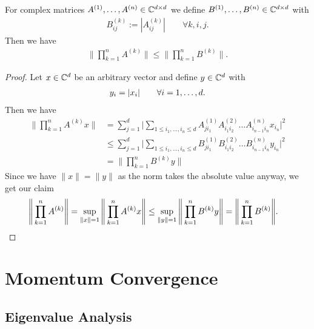 \begin{lemma}
	\label{lem-appdx: absolute value inside operator norms}
	For complex matrices \(A^{(1)},\dots,A^{(n)}\in\mathbb{C}^{d\times d}\)
	we define \(B^{(1)},\dots,B^{(n)}\in\mathbb{C}^{d\times d}\)
	with
	\begin{align*}
		B^{(k)}_{ij} := |A^{(k)}_{ij}| \qquad \forall k,i,j.
	\end{align*}
	Then we have
	\begin{align*}
		\Bigg\|\prod_{k=1}^n A^{(k)}\Bigg\| \le \Bigg\|\prod_{k=1}^n B^{(k)}\Bigg\|.
	\end{align*}
\end{lemma}
\begin{proof}
	Let \(x\in\mathbb{C}^d\) be an arbitrary vector and define \(y\in\mathbb{C}^d\)
	with
	\begin{align*}
		y_i = |x_i| \qquad \forall i=1,\dots,d.
	\end{align*}
	Then we have
	\begin{align*}
		\Bigg\| \prod_{k=1}^n A^{(k)} x \Bigg\|
		&= \sum_{j=1}^{d} \Big| \sum_{1\le i_1,\dots, i_n \le d}
		A^{(1)}_{j i_1} A^{(2)}_{i_1 i_2} \dots A^{(n)}_{i_{n-1} i_n} x_{i_n} \Big|^2
		\\
		&\le \sum_{j=1}^{d} \Big| \sum_{1\le i_1,\dots, i_n \le d}
		B^{(1)}_{j i_1} B^{(2)}_{i_1 i_2} \dots B^{(n)}_{i_{n-1} i_n} y_{i_n} \Big|^2
		\\
		&= \Bigg\| \prod_{k=1}^n B^{(k)} y \Bigg\|
	\end{align*}
	Since we have \(\|x\|=\|y\|\) as the norm takes the absolute value anyway, we
	get our claim
	\begin{align*}
		\Bigg\|\prod_{k=1}^n A^{(k)}\Bigg\|
		&= \sup_{\|x\|=1}
		\Bigg\|\prod_{k=1}^n A^{(k)} x\Bigg\|
		\le \sup_{\|y\|=1}
		\Bigg\|\prod_{k=1}^n B^{(k)} y\Bigg\|
		= \Bigg\|\prod_{k=1}^n B^{(k)}\Bigg\|.
		\qedhere
	\end{align*}
\end{proof}

\section{Momentum Convergence}

\subsection{Eigenvalue Analysis}

